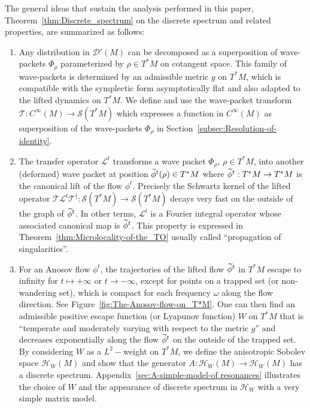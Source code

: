 \documentclass[AHL,Unicode,longabstracts,published]{cedram}
\newcommand{\clS}{\mathcal{S}}
\newcommand{\clT}{\mathcal{T}}
\newcommand{\clH}{\mathcal{H}}
\newcommand{\clL}{\mathcal{L}}
\newcommand{\clD}{\mathcal{D}}
\let\oldtilde\tilde
\renewcommand*{\tilde}[1]{\mathchoice{\widetilde{#1}}{\widetilde{#1}}{\oldtilde{#1}}{\oldtilde{#1}}}
\newcommand{\clH}{\mathcal{H}}
\begin{document}
The general ideas that sustain the analysis performed in this paper, Theorem~\ref{thm:Discrete_spectrum} on the discrete spectrum and related properties, are summarized as follows:
\begin{enumerate}
\item Any distribution in $\clD'(M)$ can be decomposed as a superposition of wave-packets $\Phi_{\rho}$ parameterized by $\rho\in T^{*}M$ on cotangent space. This family of wave-packets is determined by an admissible metric $g$ on $T^{*}M$, which is compatible with the symplectic form asymptotically flat and also adapted to the lifted dynamics on $T^{*}M$. We define and use the wave-packet transform\linebreak $\clT:C^{\infty}(M)\rightarrow\clS(T^{*}M)$ which expresses a function in $C^{\infty}(M)$ as superposition of the wave-packets $\Phi_{\rho}$ in Section~\ref{subsec:Resolution-of-identity}.
\item The transfer operator $\clL^{t}$ transforms a wave packet $\Phi_{\rho}$, $\rho\in T^{*}M$, into another (deformed) wave packet at position $\tilde{\phi}^{t}(\rho)\in T^{*}M$ where $\tilde{\phi}^{t}:T^{*}M\rightarrow T^{*}M$ is the canonical lift of the flow $\phi^{t}$. Precisely the Schwartz kernel of the lifted operator $\clT\clL^{t}\clT^{\dagger}:\clS(T^{*}M)\rightarrow\clS(T^{*}M)$ decays very fast on the outside of the graph of $\tilde{\phi}^{t}$. In other terms, $\clL^{t}$ is a Fourier integral operator whose associated canonical map is $\tilde{\phi}^{t}$. This property is expressed in Theorem~\ref{thm:Microlocality-of-the_TO} usually called ``propagation of singularities''.
\item For an Anosov flow $\phi^{t}$, the trajectories of the lifted flow $\tilde{\phi}^{t}$ in $T^{*}M$ escape to infinity for $t\mapsto+\infty$ or $t\rightarrow-\infty$, except for points on a trapped set (or non-wandering set), which is compact for each frequency $\omega$ along the flow direction. See Figure~\ref{fig:The-Anosov-flow-on_T*M}. One can then find an admissible positive escape function (or Lyapunov function) $W$ on $T^{*}M$ that is ``temperate and moderately varying with respect to the metric $g$'' and decreases exponentially along the flow $\tilde{\phi}^{t}$ on the outside of the trapped set. By considering $W$ as a $L^{2}-$weight on $T^{*}M$, we define the anisotropic Sobolev space $\clH _{W}(M)$ and show that the generator $A:\clH _{W}(M)\rightarrow\clH _{W}(M)$ has a discrete spectrum. Appendix~\ref{sec:A-simple-model-of resonances} illustrates the choice of $W$ and the appearance of discrete spectrum in $\clH _{W}$ with a very simple matrix model.
\end{enumerate}
\end{document}
